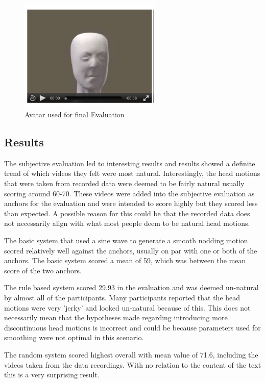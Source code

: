 \documentclass[bsc,frontabs,twoside,singlespacing,parskip]{infthesis}
\begin{document}
\begin{figure}
	\centering
	\includegraphics[width=0.6\textwidth]{eval_3.png}
	\caption{Avatar used for final Evaluation}
\end{figure}

\subsection{Results}

The subjective evaluation led to interesting results and results showed a  definite trend of which videos they felt were most natural. Interestingly, the head motions that were taken from recorded data were deemed to be fairly natural usually scoring around 60-70. These videos were added into the subjective evaluation as anchors for the evaluation and were intended to score highly but they scored less than expected. A possible reason for this could be that the recorded data does not necessarily align with what most people deem to be natural head motions.

The basic system that used a sine wave to generate a smooth nodding motion scored relatively well against the anchors, usually on par with one or both of the anchors. The basic system scored a mean of 59, which was between the mean score of the two anchors.

The rule based system scored 29.93 in the evaluation and was deemed un-natural by almost all of the participants. Many participants reported that the head motions were very 'jerky' and looked un-natural because of this. This does not necessarily mean that the hypotheses made regarding introducing more discontinuous head motions is incorrect and could be because parameters used for smoothing were not optimal in this scenario.

The random system scored highest overall with mean value of 71.6, including the videos taken from the data recordings. With no relation to the content of the text this is a very surprising result. 
\end{document}
